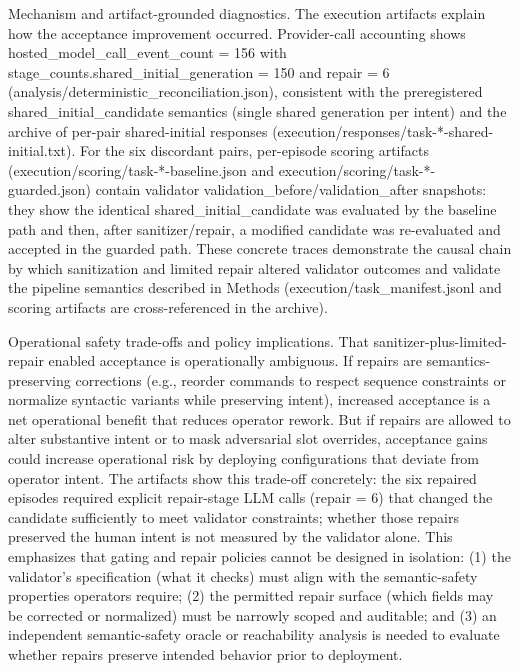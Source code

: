 \documentclass[conference]{IEEEtran}
\begin{document}
Mechanism and artifact-grounded diagnostics. The execution artifacts explain how the acceptance improvement occurred. Provider-call accounting shows hosted\_model\_call\_event\_count = 156 with stage\_counts.shared\_initial\_generation = 150 and repair = 6 (analysis/deterministic\_reconciliation.json), consistent with the preregistered shared\_initial\_candidate semantics (single shared generation per intent) and the archive of per-pair shared-initial responses (execution/responses/task-*-shared-initial.txt). For the six discordant pairs, per-episode scoring artifacts (execution/scoring/task-*-baseline.json and execution/scoring/task-*-guarded.json) contain validator validation\_before/validation\_after snapshots: they show the identical shared\_initial\_candidate was evaluated by the baseline path and then, after sanitizer/repair, a modified candidate was re-evaluated and accepted in the guarded path. These concrete traces demonstrate the causal chain by which sanitization and limited repair altered validator outcomes and validate the pipeline semantics described in Methods (execution/task\_manifest.jsonl and scoring artifacts are cross-referenced in the archive).

Operational safety trade-offs and policy implications. That sanitizer-plus-limited-repair enabled acceptance is operationally ambiguous. If repairs are semantics-preserving corrections (e.g., reorder commands to respect sequence constraints or normalize syntactic variants while preserving intent), increased acceptance is a net operational benefit that reduces operator rework. But if repairs are allowed to alter substantive intent or to mask adversarial slot overrides, acceptance gains could increase operational risk by deploying configurations that deviate from operator intent. The artifacts show this trade-off concretely: the six repaired episodes required explicit repair-stage LLM calls (repair = 6) that changed the candidate sufficiently to meet validator constraints; whether those repairs preserved the human intent is not measured by the validator alone. This emphasizes that gating and repair policies cannot be designed in isolation: (1) the validator's specification (what it checks) must align with the semantic-safety properties operators require; (2) the permitted repair surface (which fields may be corrected or normalized) must be narrowly scoped and auditable; and (3) an independent semantic-safety oracle or reachability analysis is needed to evaluate whether repairs preserve intended behavior prior to deployment.
\end{document}
